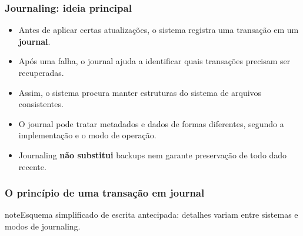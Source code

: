 \documentclass[aspectratio=169,11pt]{beamer}
\begin{document}
\begin{frame}
\frametitle{Journaling: ideia principal}
\large
\begin{itemize}
\item Antes de aplicar certas atualizações, o sistema registra uma transação em um \textbf{journal}.
\item Após uma falha, o journal ajuda a identificar quais transações precisam ser recuperadas.
\item Assim, o sistema procura manter estruturas do sistema de arquivos consistentes.
\item O journal pode tratar metadados e dados de formas diferentes, segundo a implementação e o modo de operação.
\item Journaling \textbf{não substitui} backups nem garante preservação de todo dado recente.
\end{itemize}

\end{frame}

\begin{frame}
\frametitle{O princípio de uma transação em journal}
\begin{center}\end{center}
\vfill\begin{beamercolorbox}[wd=\textwidth,sep=2mm,rounded=true]{note}\small Esquema simplificado de escrita antecipada: detalhes variam entre sistemas e modos de journaling.\end{beamercolorbox}
\end{frame}
\end{document}
